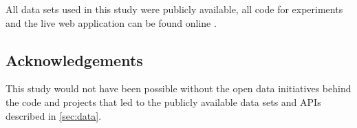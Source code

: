 \documentclass[runningheads,a4paper]{llncs}
\begin{document}
All data sets used in this study were publicly available, all code for experiments and the live web application can be found online \cite{fipi, fipidemo}.

\subsection*{Acknowledgements}
This study would not have been possible without the open data initiatives behind the code and projects that led to the publicly available data sets and APIs described in \autoref{sec:data}.
%
\small{

 
}
\end{document}
